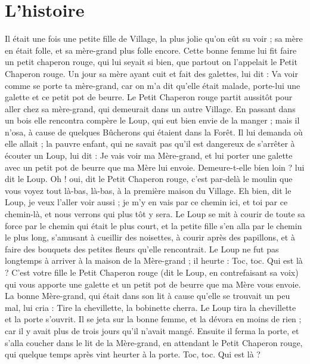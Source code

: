 \documentclass[a4paper,11pt]{article}
\begin{document}
\section{L'histoire}
Il était une fois une petite fille de Village, la plus jolie qu'on eût su voir ; sa mère en était folle, et sa mère-grand plus folle encore. Cette bonne femme lui fit faire un petit chaperon rouge, qui lui seyait si bien, que partout on l'appelait le Petit Chaperon rouge.
Un jour sa mère ayant cuit et fait des galettes, lui dit :
Va voir comme se porte ta mère-grand, car on m'a dit qu'elle était malade, porte-lui une galette et ce petit pot de beurre. Le Petit Chaperon rouge partit aussitôt pour aller chez sa mère-grand, qui demeurait dans un autre Village. En passant dans un bois elle rencontra compère le Loup, qui eut bien envie de la manger ; mais il n'osa, à cause de quelques Bûcherons qui étaient dans la Forêt. Il lui demanda où elle allait ; la pauvre enfant, qui ne savait pas qu'il est dangereux de s'arrêter à écouter un Loup, lui dit : Je vais voir ma Mère-grand, et lui porter une galette avec un petit pot de beurre que ma Mère lui envoie.
Demeure-t-elle bien loin ? lui dit le Loup. Oh ! oui, dit le Petit Chaperon rouge, c'est par-delà le moulin que vous voyez tout là-bas, là-bas, à la première maison du Village. Eh bien, dit le Loup, je veux l'aller voir aussi ; je m'y en vais par ce chemin ici, et toi par ce chemin-là, et nous verrons qui plus tôt y sera. Le Loup se mit à courir de toute sa force par le chemin qui était le plus court, et la petite fille s'en alla par le chemin le plus long, s'amusant à cueillir des noisettes, à courir après des papillons, et à faire des bouquets des petites fleurs qu'elle rencontrait.
Le Loup ne fut pas longtemps à arriver à la maison de la Mère-grand ; il heurte :
Toc, toc. Qui est là ? C'est votre fille le Petit Chaperon rouge (dit le Loup, en contrefaisant sa voix) qui vous apporte une galette et un petit pot de beurre que ma Mère vous envoie. La bonne Mère-grand, qui était dans son lit à cause qu'elle se trouvait un peu mal, lui cria : Tire la chevillette, la bobinette cherra.
Le Loup tira la chevillette et la porte s'ouvrit. Il se jeta sur la bonne femme, et la dévora en moins de rien ; car il y avait plus de trois jours qu'il n'avait mangé. Ensuite il ferma la porte, et s'alla coucher dans le lit de la Mère-grand, en attendant le Petit Chaperon rouge, qui quelque temps après vint heurter à la porte. Toc, toc. Qui est là ?
\end{document}
